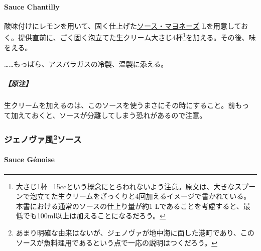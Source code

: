 \begin{recette}
\hypertarget{sauce-chantilly-froide}{%
\paragraph{Sauce Chantilly}\label{sauce-chantilly-froide}}


酸味付けにレモンを用いて、固く仕上げた\protect\hyperlink{mayonnaise}{ソース・マヨネーズ}\troisquarts{}
Lを用意しておく。提供直前に、ごく固く泡立てた生クリーム大さじ4杯\footnote{大さじ1杯=15ccという概念にとらわれないよう注意。原文は、大きなスプーンで泡立てた生クリームをざっくりと4回加えるイメージで書かれている。本書における通常のソースの仕上り量が約1
  Lであることを考慮すると、最低でも100ml以上は加えることになるだろう。}を加える。その後、味をえる。

\ldots{}\ldots{}もっぱら、アスパラガスの冷製、温製に添える。

\hypertarget{ux539fux6ce8-1}{%
\subparagraph{【原注】}\label{ux539fux6ce8-1}}

生クリームを加えるのは、このソースを使うまさにその時にすること。前もっ
て加えておくと、ソースが分離してしまう恐れがあるので注意。

\maeaki

\hypertarget{ux30b8ux30a7ux30ceux30f4ux30a1ux98a812ux30bdux30fcux30b9}{%
\subsubsection[ジェノヴァ風ソース]{\texorpdfstring{ジェノヴァ風\footnote{あまり明確な由来はないが、ジェノヴァが地中海に面した港町であり、このソースが魚料理用であるという点で一応の説明はつくだろう。}ソース}{ジェノヴァ風ソース}}\label{ux30b8ux30a7ux30ceux30f4ux30a1ux98a812ux30bdux30fcux30b9}}

\hypertarget{sauce-genoise-froids}{%
\paragraph{Sauce Génoise}\label{sauce-genoise-froids}}



\end{recette}
